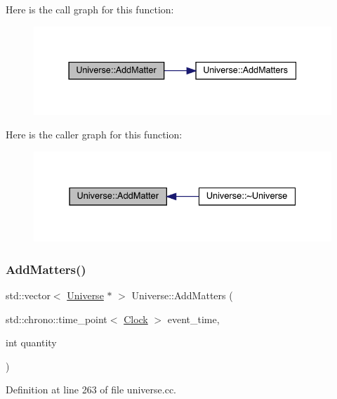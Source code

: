 Here is the call graph for this function\+:
\nopagebreak
\begin{figure}[H]
\begin{center}
\leavevmode
\includegraphics[width=337pt]{class_universe_a090d9ad1b88d81364e872e17d65edca4_cgraph}
\end{center}
\end{figure}
Here is the caller graph for this function\+:
\nopagebreak
\begin{figure}[H]
\begin{center}
\leavevmode
\includegraphics[width=331pt]{class_universe_a090d9ad1b88d81364e872e17d65edca4_icgraph}
\end{center}
\end{figure}
\mbox{\label{class_universe_ae00d10b2a23c9cedf1ff89e9da875563}} 
\subsubsection{\texorpdfstring{Add\+Matters()}{AddMatters()}}
{\footnotesize\ttfamily std\+::vector$<$ \hyperlink{class_universe}{Universe} $\ast$ $>$ Universe\+::\+Add\+Matters (\begin{DoxyParamCaption}\item[{std\+::chrono\+::time\+\_\+point$<$ \hyperlink{universe_8h_a0ef8d951d1ca5ab3cfaf7ab4c7a6fd80}{Clock} $>$}]{event\+\_\+time,  }\item[{int}]{quantity }\end{DoxyParamCaption})}



Definition at line 263 of file universe.\+cc.

